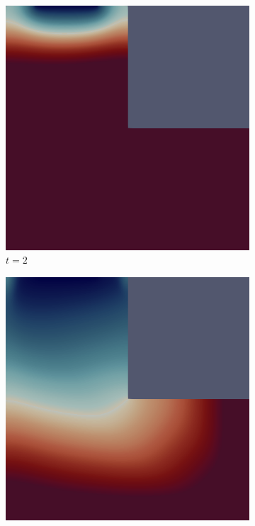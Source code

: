 \vfill\pagebreak

\begin{figure}[H]
    \centering
    \caption{$L$-shape with a Sink: State Solution}
    \begin{subfigure}{.4\textwidth}
        \includegraphics[width=\textwidth]{imgs/LShape_Solution/first.png}
        \caption{$t = 2$}
    \end{subfigure}
    \begin{subfigure}{.4\textwidth}
        \includegraphics[width=\textwidth]{imgs/LShape_Solution/second.png}

\end{subfigure}
\end{figure}
